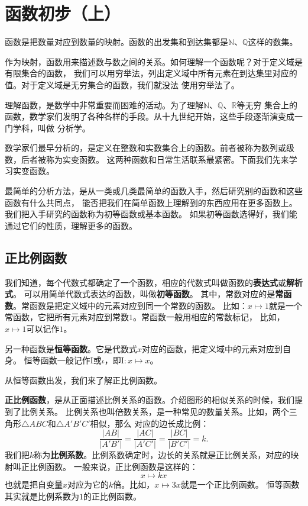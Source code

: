 \documentclass[12pt,UTF8]{ctexbook}
\begin{document}
\chapter{函数初步（上）}
函数是把数量对应到数量的映射。函数的出发集和到达集都是$\mathbb{N}$、$\mathbb{Q}$这样的数集。

作为映射，函数用来描述数与数之间的关系。如何理解一个函数呢？对于定义域是有限集合的函数，
我们可以用穷举法，列出定义域中所有元素在到达集里对应的值。对于定义域是无穷集合的函数，我们就没法
使用穷举法了。

理解函数，是数学中非常重要而困难的活动。为了理解$\mathbb{N}$、$\mathbb{Q}$、$\mathbb{R}$等无穷
集合上的函数，数学家们发明了各种各样的手段。从十九世纪开始，这些手段逐渐演变成一门学科，叫做
分析学。

数学家们最早分析的，是定义在整数和实数集合上的函数。前者被称为数列或级数，后者被称为实变函数。
这两种函数和日常生活联系最紧密。下面我们先来学习实变函数。

最简单的分析方法，是从一类或几类最简单的函数入手，然后研究别的函数和这些函数有什么共同点，
能否把我们在简单函数上理解到的东西应用在更多函数上。我们把入手研究的函数称为初等函数或基本函数。
如果初等函数选得好，我们能通过它们的性质，理解更多的函数。

\section{正比例函数}
我们知道，每个代数式都确定了一个函数，相应的代数式叫做函数的\textbf{表达式}或\textbf{解析式}。
可以用简单代数式表达的函数，叫做\textbf{初等函数}。
其中，常数对应的是\textbf{常函数}。常函数是把定义域中的元素对应到同一个常数的函数。
比如：$x\mapsto 1$就是一个常函数，它把所有元素对应到常数$1$。常函数一般用相应的常数标记，
比如，$x\mapsto 1$可以记作$1$。

另一种函数是\textbf{恒等函数}。它是代数式$x$对应的函数，把定义域中的元素对应到自身。
恒等函数一般记作$\mathrm{I}$或$\iota$，即$\mathrm{I}:x \mapsto x$。

从恒等函数出发，我们来了解正比例函数。

\textbf{正比例函数}，是从正面描述比例关系的函数。介绍图形的相似关系的时候，我们提到了比例关系。
比例关系也叫倍数关系，是一种常见的数量关系。比如，两个三角形$\triangle ABC$和$\triangle A'B'C'$相似，那么
对应的边长成比例：
$$ \frac{|AB|}{|A'B'|} = \frac{|AC|}{|A'C'|} = \frac{|BC|}{|B'C'|} = k.$$
我们把$k$称为\textbf{比例系数}。比例系数确定时，边长的关系就是正比例关系，对应的映射叫正比例函数。
一般来说，正比例函数是这样的：
$$ x \mapsto kx$$
也就是把自变量$x$对应为它的$k$倍。比如，$x \mapsto 3x$就是一个正比例函数。
恒等函数其实就是比例系数为$1$的正比例函数。
\end{document}
